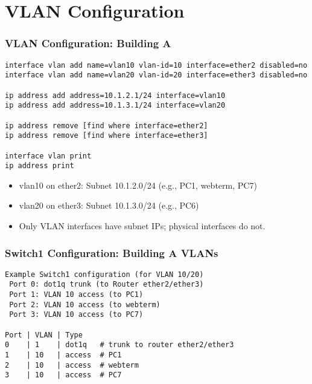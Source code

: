 \documentclass{beamer}
\begin{document}
\section{VLAN Configuration}

\begin{frame}[fragile,label=vlans]
\frametitle{VLAN Configuration: Building A}
\begin{lstlisting}
interface vlan add name=vlan10 vlan-id=10 interface=ether2 disabled=no
interface vlan add name=vlan20 vlan-id=20 interface=ether3 disabled=no

ip address add address=10.1.2.1/24 interface=vlan10
ip address add address=10.1.3.1/24 interface=vlan20

ip address remove [find where interface=ether2]
ip address remove [find where interface=ether3]

interface vlan print
ip address print
\end{lstlisting}
\begin{itemize}
    \item vlan10 on ether2: Subnet 10.1.2.0/24 (e.g., PC1, webterm, PC7)
    \item vlan20 on ether3: Subnet 10.1.3.0/24 (e.g., PC6)
    \item Only VLAN interfaces have subnet IPs; physical interfaces do not.
\end{itemize}
\end{frame}

\begin{frame}[fragile]
\frametitle{Switch1 Configuration: Building A VLANs}
\begin{lstlisting}
Example Switch1 configuration (for VLAN 10/20)
 Port 0: dot1q trunk (to Router ether2/ether3)
 Port 1: VLAN 10 access (to PC1)
 Port 2: VLAN 10 access (to webterm)
 Port 3: VLAN 10 access (to PC7)

Port | VLAN | Type
0    | 1    | dot1q   # trunk to router ether2/ether3
1    | 10   | access  # PC1
2    | 10   | access  # webterm
3    | 10   | access  # PC7
\end{lstlisting}
\end{frame}
\end{document}

